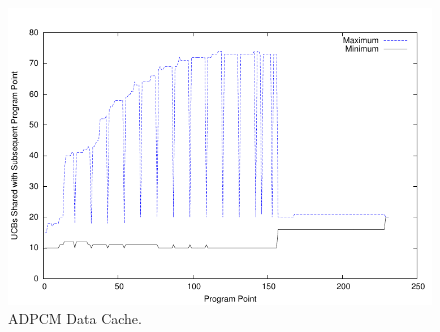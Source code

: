 \begin{figure}[h!]
\vspace{-10pt}
\begin{center}
\includegraphics[width=\linewidth]{eps/adpcm-dcache.pdf}
\caption{ADPCM Data Cache.}
\label{fig:adpcm_data_cache}
\end{center}
\vspace{-10pt}
\end{figure}
%
%
%
%
%
%
